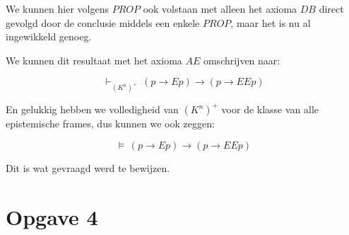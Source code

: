 \documentclass[a4paper,11pt]{article}
\begin{document}
We kunnen hier volgens $PROP$ ook volstaan met alleen het axioma $DB$ direct
gevolgd door de conclusie middels een enkele $PROP$, maar het is nu al
ingewikkeld genoeg.

We kunnen dit resultaat met het axioma $AE$ omschrijven naar:

\begin{displaymath}
\vdash_{(K^{n})^{+}} \, (p \to E p) \to (p \to E E p)
\end{displaymath}

En gelukkig hebben we volledigheid van $(K^{n})^{+}$ voor de klasse van alle
epistemische frames, dus kunnen we ook zeggen:

\begin{displaymath}
\vDash \, (p \to E p) \to (p \to E E p)
\end{displaymath}

Dit is wat gevraagd werd te bewijzen.


\section*{Opgave 4}
\end{document}
